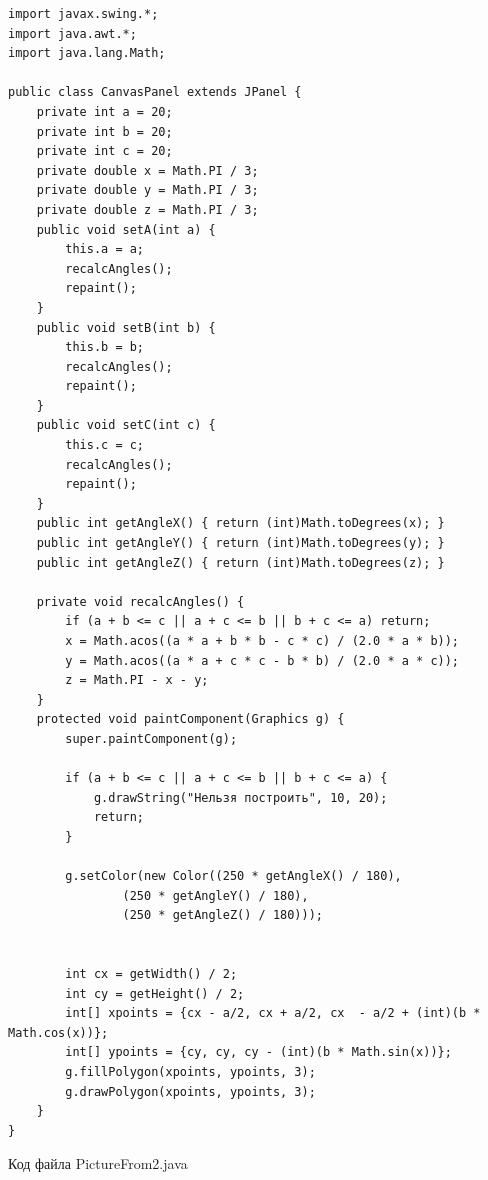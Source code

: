 \documentclass[a4paper, 14pt]{extarticle}
\begin{document}
\begin{lstlisting}
import javax.swing.*;
import java.awt.*;
import java.lang.Math;

public class CanvasPanel extends JPanel {
    private int a = 20;
    private int b = 20;
    private int c = 20;
    private double x = Math.PI / 3;
    private double y = Math.PI / 3;
    private double z = Math.PI / 3;
    public void setA(int a) {
        this.a = a;
        recalcAngles();
        repaint();
    }
    public void setB(int b) {
        this.b = b;
        recalcAngles();
        repaint();
    }
    public void setC(int c) {
        this.c = c;
        recalcAngles();
        repaint();
    }
    public int getAngleX() { return (int)Math.toDegrees(x); }
    public int getAngleY() { return (int)Math.toDegrees(y); }
    public int getAngleZ() { return (int)Math.toDegrees(z); }

    private void recalcAngles() {
        if (a + b <= c || a + c <= b || b + c <= a) return;
        x = Math.acos((a * a + b * b - c * c) / (2.0 * a * b));
        y = Math.acos((a * a + c * c - b * b) / (2.0 * a * c));
        z = Math.PI - x - y;
    }
    protected void paintComponent(Graphics g) {
        super.paintComponent(g);

        if (a + b <= c || a + c <= b || b + c <= a) {
            g.drawString("Нельзя построить", 10, 20);
            return;
        }

        g.setColor(new Color((250 * getAngleX() / 180),
                (250 * getAngleY() / 180),
                (250 * getAngleZ() / 180)));


        int cx = getWidth() / 2;
        int cy = getHeight() / 2;
        int[] xpoints = {cx - a/2, cx + a/2, cx  - a/2 + (int)(b * Math.cos(x))};
        int[] ypoints = {cy, cy, cy - (int)(b * Math.sin(x))};
        g.fillPolygon(xpoints, ypoints, 3);
        g.drawPolygon(xpoints, ypoints, 3);
    }
}
\end{lstlisting}
\par
Код файла PictureFrom2.java
\end{document}
